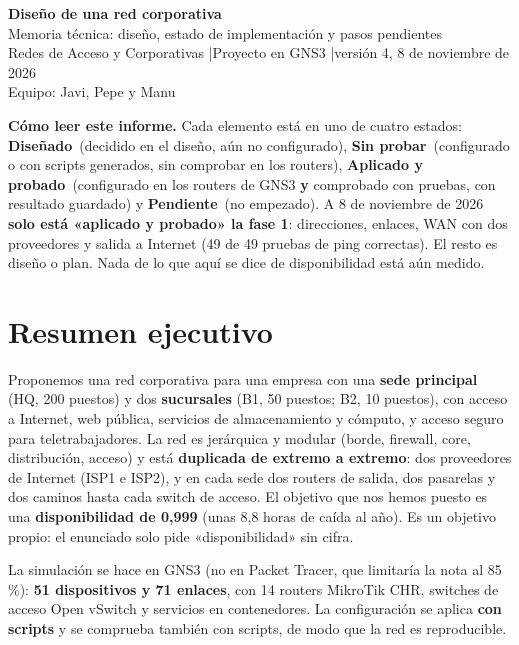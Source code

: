 \documentclass[11pt,a4paper]{article}
\newcommand{\ok}{\textcolor{verde}{\textbf{Aplicado y probado}}}
\newcommand{\dis}{\textcolor{azul}{\textbf{Diseñado}}}
\newcommand{\pen}{\textcolor{rojo}{\textbf{Pendiente}}}
\newcommand{\sinp}{\textcolor{naranja}{\textbf{Sin probar}}}
\newenvironment{nota}{\par\medskip\noindent\begin{lrbox}{\notebox}\begin{minipage}{0.95\textwidth}\small}{\end{minipage}\end{lrbox}\fcolorbox{black!30}{amar}{\usebox{\notebox}}\par\medskip}
\begin{document}
\begin{center}
{\Huge\bfseries Diseño de una red corporativa}\\[2pt]
{\Large Memoria técnica: diseño, estado de implementación y pasos pendientes}\\[2pt]
{\large Redes de Acceso y Corporativas \quad|\quad Proyecto en GNS3 \quad|\quad versión 4, 8 de noviembre de 2026}\\[2pt]
{\normalsize Equipo: Javi, Pepe y Manu}
\end{center}

\begin{nota}
\textbf{Cómo leer este informe.} Cada elemento está en uno de cuatro estados:
\dis\ (decidido en el diseño, aún no configurado),
\sinp\ (configurado o con scripts generados, sin comprobar en los routers),
\ok\ (configurado en los routers de GNS3 \textbf{y} comprobado con pruebas, con resultado guardado) y
\pen\ (no empezado).
A 8 de noviembre de 2026 \textbf{solo está «aplicado y probado» la fase 1}: direcciones, enlaces, WAN con dos proveedores y salida a Internet (49 de 49 pruebas de ping correctas). El resto es diseño o plan. Nada de lo que aquí se dice de disponibilidad está aún medido.
\end{nota}

\section{Resumen ejecutivo}
Proponemos una red corporativa para una empresa con una \textbf{sede principal} (HQ, 200 puestos) y dos \textbf{sucursales} (B1, 50 puestos; B2, 10 puestos), con acceso a Internet, web pública, servicios de almacenamiento y cómputo, y acceso seguro para teletrabajadores. La red es jerárquica y modular (borde, firewall, core, distribución, acceso) y está \textbf{duplicada de extremo a extremo}: dos proveedores de Internet (ISP1 e ISP2), y en cada sede dos routers de salida, dos pasarelas y dos caminos hasta cada switch de acceso. El objetivo que nos hemos puesto es una \textbf{disponibilidad de 0,999} (unas 8,8 horas de caída al año). Es un objetivo propio: el enunciado solo pide «disponibilidad» sin cifra.

La simulación se hace en GNS3 (no en Packet Tracer, que limitaría la nota al 85\,\%): \textbf{51 dispositivos y 71 enlaces}, con 14 routers MikroTik CHR, switches de acceso Open vSwitch y servicios en contenedores. La configuración se aplica \textbf{con scripts} y se comprueba también con scripts, de modo que la red es reproducible.
\end{document}
